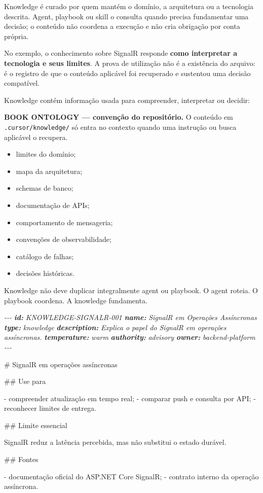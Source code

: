 \documentclass[
  10pt,
  a4paper,
  oneside]{book}
\newenvironment{Shaded}{}{}
\newcommand{\AnnotationTok}[1]{\textcolor[rgb]{0.38,0.63,0.69}{\textbf{\textit{#1}}}}
\newcommand{\CommentTok}[1]{\textcolor[rgb]{0.38,0.63,0.69}{\textit{#1}}}
\newcommand{\FunctionTok}[1]{\textcolor[rgb]{0.02,0.16,0.49}{#1}}
\newcommand{\NormalTok}[1]{#1}
\newcommand{\SpecialStringTok}[1]{\textcolor[rgb]{0.73,0.40,0.53}{#1}}
\providecommand{\tightlist}{%
  \setlength{\itemsep}{0pt}\setlength{\parskip}{0pt}}
\begin{document}
Knowledge é curado por quem mantém o domínio, a arquitetura ou a
tecnologia descrita. Agent, playbook ou skill o consulta quando precisa
fundamentar uma decisão; o conteúdo não coordena a execução e não cria
obrigação por conta própria.

No exemplo, o conhecimento sobre SignalR responde \textbf{como
interpretar a tecnologia e seus limites}. A prova de utilização não é a
existência do arquivo: é o registro de que o conteúdo aplicável foi
recuperado e sustentou uma decisão compatível.

Knowledge contém informação usada para compreender, interpretar ou
decidir:

\textbf{BOOK ONTOLOGY --- convenção do repositório.} O conteúdo em
\texttt{.cursor/knowledge/} só entra no contexto quando uma instrução ou
busca aplicável o recupera.

\begin{itemize}
\tightlist
\item
  limites do domínio;
\item
  mapa da arquitetura;
\item
  schemas de banco;
\item
  documentação de APIs;
\item
  comportamento de mensageria;
\item
  convenções de observabilidade;
\item
  catálogo de falhas;
\item
  decisões históricas.
\end{itemize}

Knowledge não deve duplicar integralmente agent ou playbook. O agent
roteia. O playbook coordena. A knowledge fundamenta.

\begin{Shaded}
\begin{Highlighting}[]
\CommentTok{{-}{-}{-}}
\AnnotationTok{id:}\CommentTok{ KNOWLEDGE{-}SIGNALR{-}001}
\AnnotationTok{name:}\CommentTok{ SignalR em Operações Assíncronas}
\AnnotationTok{type:}\CommentTok{ knowledge}
\AnnotationTok{description:}\CommentTok{ Explica o papel do SignalR em operações assíncronas.}
\AnnotationTok{temperature:}\CommentTok{ warm}
\AnnotationTok{authority:}\CommentTok{ advisory}
\AnnotationTok{owner:}\CommentTok{ backend{-}platform}
\CommentTok{{-}{-}{-}}

\FunctionTok{\# SignalR em operações assíncronas}

\FunctionTok{\#\# Use para}

\SpecialStringTok{{-} }\NormalTok{compreender atualização em tempo real;}
\SpecialStringTok{{-} }\NormalTok{comparar push e consulta por API;}
\SpecialStringTok{{-} }\NormalTok{reconhecer limites de entrega.}

\FunctionTok{\#\# Limite essencial}

\NormalTok{SignalR reduz a latência percebida, mas não substitui o estado durável.}

\FunctionTok{\#\# Fontes}

\SpecialStringTok{{-} }\NormalTok{documentação oficial do ASP.NET Core SignalR;}
\SpecialStringTok{{-} }\NormalTok{contrato interno da operação assíncrona.}
\end{Highlighting}
\end{Shaded}
\end{document}

